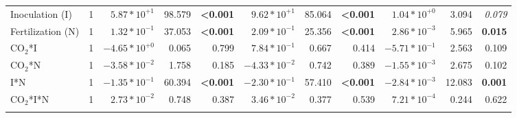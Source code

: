 \begin{landscape}
\begin{table}
{\begin{tabular}{p{3cm}p{0.5cm}p{1.75cm}p{1.5cm}p{1.5cm}p{1.75cm}p{1.5cm}p{1.5cm}p{1.75cm}p{1.5cm}p{1.5cm}}
            Inoculation (I) & \multicolumn{1}{r}{1}
            & \multicolumn{1}{r}{$5.87*10^{+1}$}      & \multicolumn{1}{r}{98.579}        & \multicolumn{1}{r}{\textbf{<0.001}}
            & \multicolumn{1}{r}{$9.62*10^{+1}$}      & \multicolumn{1}{r}{85.064}        & \multicolumn{1}{r}{\textbf{<0.001}}
            & \multicolumn{1}{r}{$1.04*10^{+0}$}      & \multicolumn{1}{r}{3.094}         & \multicolumn{1}{r}{\textit{ 0.079}} 
            \\

            Fertilization (N) & \multicolumn{1}{r}{1}
            & \multicolumn{1}{r}{$1.32*10^{-1}$}      & \multicolumn{1}{r}{37.053}        & \multicolumn{1}{r}{\textbf{<0.001}}
            & \multicolumn{1}{r}{$2.09*10^{-1}$}      & \multicolumn{1}{r}{25.356}        & \multicolumn{1}{r}{\textbf{<0.001}}
            & \multicolumn{1}{r}{$2.86*10^{-3}$}      & \multicolumn{1}{r}{5.965}         & \multicolumn{1}{r}{\textbf{ 0.015}} 
            \\

            CO$_2$*I & \multicolumn{1}{r}{1}
            & \multicolumn{1}{r}{$-4.65*10^{+0}$}     & \multicolumn{1}{r}{0.065}         & \multicolumn{1}{r}{0.799}
            & \multicolumn{1}{r}{$7.84*10^{-1}$}     & \multicolumn{1}{r}{0.667}         & \multicolumn{1}{r}{0.414}
            & \multicolumn{1}{r}{$-5.71*10^{-1}$}     & \multicolumn{1}{r}{2.563}         & \multicolumn{1}{r}{0.109} 
            \\

            CO$_2$*N & \multicolumn{1}{r}{1}
            & \multicolumn{1}{r}{$-3.58*10^{-2}$}     & \multicolumn{1}{r}{1.758}         & \multicolumn{1}{r}{0.185}
            & \multicolumn{1}{r}{$-4.33*10^{-2}$}     & \multicolumn{1}{r}{0.742}         & \multicolumn{1}{r}{0.389}
            & \multicolumn{1}{r}{$-1.55*10^{-3}$}     & \multicolumn{1}{r}{2.675}         & \multicolumn{1}{r}{0.102} 
            \\

            I*N & \multicolumn{1}{r}{1}
            & \multicolumn{1}{r}{$-1.35*10^{-1}$}     & \multicolumn{1}{r}{60.394}        & \multicolumn{1}{r}{\textbf{<0.001}}
            & \multicolumn{1}{r}{$-2.30*10^{-1}$}     & \multicolumn{1}{r}{57.410}        & \multicolumn{1}{r}{\textbf{<0.001}}
            & \multicolumn{1}{r}{$-2.84*10^{-3}$}     & \multicolumn{1}{r}{12.083}        & \multicolumn{1}{r}{\textbf{0.001}} 
            \\

            CO$_2$*I*N & \multicolumn{1}{r}{1}
            & \multicolumn{1}{r}{$2.73*10^{-2}$}      & \multicolumn{1}{r}{0.748}         & \multicolumn{1}{r}{0.387}
            & \multicolumn{1}{r}{$3.46*10^{-2}$}      & \multicolumn{1}{r}{0.377}         & \multicolumn{1}{r}{0.539}
            & \multicolumn{1}{r}{$7.21*10^{-4}$}      & \multicolumn{1}{r}{0.244}         & \multicolumn{1}{r}{0.622} 
            \\
            \hline
            &&&&&&&&&&
            \\


\end{tabular}}
\end{table}
\end{landscape}
